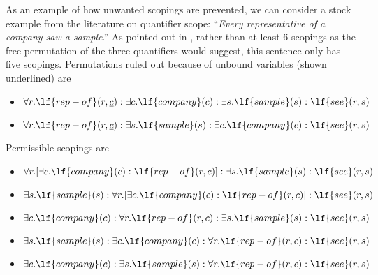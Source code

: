As an example of how unwanted scopings are prevented, we can consider a stock
example from the literature on quantifier scope: ``{\it Every representative
of a company saw a sample}.''  As pointed out in , rather
than at least 6 scopings as the free permutation of the three quantifiers
would suggest, this sentence only has five scopings.  Permutations
ruled out because of unbound variables (shown underlined) are
\begin{itemize}
\item $\forall r. \lf{rep-of}(r,\underline{c}): 
   \exists c. \lf{company}(c): \exists s. \lf{sample}(s): \lf{see}(r,s)$
\item $\forall r. \lf{rep-of}(r,\underline{c}): 
   \exists s. \lf{sample}(s): \exists c. \lf{company}(c):  \lf{see}(r,s)$
\end{itemize}
Permissible scopings are
\begin{itemize}
\item $\forall r. [\exists c. \lf{company}(c):\lf{rep-of}(r,c)]: 
    \exists s. \lf{sample}(s): \lf{see}(r,s)$
\item $\exists s. \lf{sample}(s):
   \forall r. [\exists c. \lf{company}(c):\lf{rep-of}(r,c)]: 
     \lf{see}(r,s)$
\item $\exists c. \lf{company}(c): \forall r. \lf{rep-of}(r,c): 
    \exists s. \lf{sample}(s): \lf{see}(r,s)$
\item $\exists s. \lf{sample}(s): 
  \exists c. \lf{company}(c): \forall r. \lf{rep-of}(r,c): 
    \lf{see}(r,s)$
\item $\exists c. \lf{company}(c): \exists s. \lf{sample}(s): 
   \forall r. \lf{rep-of}(r,c): 
    \lf{see}(r,s)$
\end{itemize}

